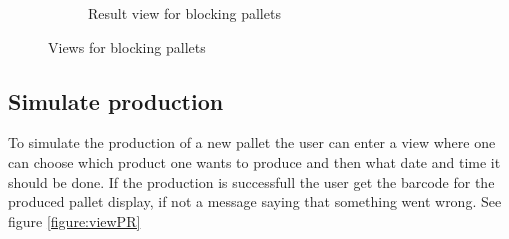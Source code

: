 \documentclass[a4paper]{scrartcl}
\numberwithin{equation}{section}
\begin{document}
\begin{figure}[h!]
\begin{subfigure}[b]{0.45\textwidth}
    	\label{figure:view_blockResult}
    	\caption{Result view for blocking pallets}
 		\end{subfigure} 
 		\caption{Views for blocking pallets}
    \label{figure:view_blocking}
\end{figure}

\subsection*{Simulate production}

To simulate the production of a new pallet the user can enter a view where one can choose which product one wants to produce and then what date and time it should be done. If the production is successfull the user get the barcode for the produced pallet display, if not a message saying that something went wrong. See figure \ref{figure:viewPR}
\end{document}
